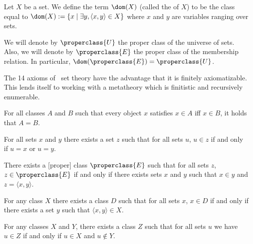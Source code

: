 \begin{definition}\label{nbg-000A}%
Let $X$ be a set. We define the term $\dom(X)$ (called the
 of $X$) to be the class equal to
$\dom(X):=\{x\mid\exists y,\langle x,y\rangle\in X\}$ where $x$ and $y$
are variables ranging over sets.
\end{definition}

\begin{node}[Notation]\label{nbg-000B}%
We will denote by $\properclass{U}$ the proper class of the universe of sets.
Also, we will denote by $\properclass{E}$ the proper class of the
membership relation.
In particular, $\dom(\properclass{E})=\properclass{U}$.
\end{node}

\begin{node}[Axioms]\label{nbg-0004}%
The 14 axioms of \NBG\ set theory have the advantage that it is finitely
axiomatizable. This lends itself to working with a metatheory which is
finitistic and recursively enumerable.

\begin{node}\label{nbg-0005}%
For all classes $A$ and $B$ such that every object $x$ satisfies $x\in A$
iff $x\in B$, it holds that $A=B$.
\end{node}

\begin{node}\label{nbg-0006}%
For all sets $x$ and $y$ there exists a set $z$ such that for all sets
$u$, $u\in z$ if and only if $u=x$ or $u=y$.
\end{node}

\begin{node}\label{nbg-0008}%
There exists a [proper] class $\properclass{E}$ such that for all sets $z$,
$z\in\properclass{E}$ if and only if there exists sets $x$ and $y$ such
that $x\in y$ and $z=\langle x,y\rangle$.
\end{node}

\begin{node}\label{nbg-0009}%
For any class $X$ there exists a class $D$ such that for all sets $x$,
$x\in D$ if and only if there exists a set $y$ such that $\langle x,y\rangle\in X$.
\end{node}

\begin{node}\label{nbg-000G}%
For any classes $X$ and $Y$, there exists a class $Z$ such that for all
sets $u$ we have $u\in Z$ if and only if $u\in X$ and $u\notin Y$.
\end{node}


\end{node}
